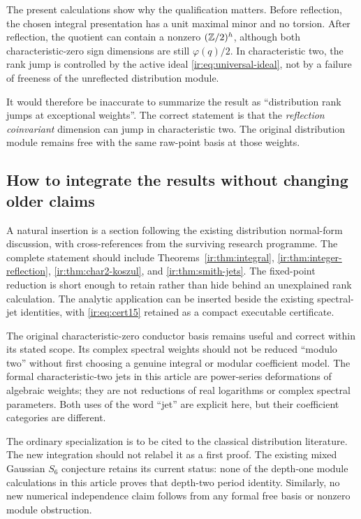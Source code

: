 The present calculations show why the qualification matters. Before
reflection, the chosen integral presentation has a unit maximal minor
and no torsion. After reflection, the quotient can contain a nonzero
$(\mathbb Z/2)^h$, although both characteristic-zero sign dimensions are
still $\varphi(q)/2$. In characteristic two, the rank jump is controlled
by the active ideal \eqref{ir:eq:universal-ideal}, not by a failure of
freeness of the unreflected distribution module.

It would therefore be inaccurate to summarize the result as
``distribution rank jumps at exceptional weights''. The correct
statement is that the \emph{reflection coinvariant} dimension can jump
in characteristic two. The original distribution module remains free
with the same raw-point basis at those weights.

\subsection{How to integrate the results without changing older claims}
A natural insertion is a section following the existing distribution
normal-form discussion, with cross-references from the surviving
research programme. The complete statement should include
Theorems~\ref{ir:thm:integral}, \ref{ir:thm:integer-reflection},
\ref{ir:thm:char2-koszul}, and \ref{ir:thm:smith-jets}. The
fixed-point reduction is short enough to retain rather than hide behind
an unexplained rank calculation. The analytic application can be
inserted beside the existing spectral-jet identities, with
\eqref{ir:eq:cert15} retained as a compact executable certificate.

The original characteristic-zero conductor basis remains useful and
correct within its stated scope. Its complex spectral weights should
not be reduced ``modulo two'' without first choosing a genuine integral
or modular coefficient model. The formal characteristic-two jets in
this article are power-series deformations of algebraic weights;
they are not reductions of real logarithms or complex spectral
parameters. Both uses of the word ``jet'' are explicit here, but their
coefficient categories are different.

The ordinary specialization is to be cited to the classical distribution
literature. The new integration should not relabel it as a first proof.
The existing mixed Gaussian $S_6$ conjecture retains its current status:
none of the depth-one module calculations in this article proves that
depth-two period identity. Similarly, no new numerical independence
claim follows from any formal free basis or nonzero module obstruction.

